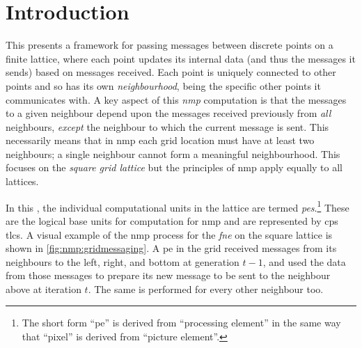 \section{Introduction}
This  presents a framework for passing messages between discrete points on a finite lattice, where each point updates its internal data (and thus the messages it sends) based on messages received.  Each point is uniquely connected to other points and so has its own \emph{neighbourhood}, being the specific other points it communicates with.  A key aspect of this \emph{\gls{nmp}} computation is that the messages to a given neighbour depend upon the messages received previously from \emph{all} neighbours, \emph{except} the neighbour to which the current message is sent.    This necessarily means that in \gls{nmp} each grid location must have at least two neighbours; a single neighbour cannot form a meaningful neighbourhood.  This  focuses on the \emph{square grid lattice}
but the principles of \gls{nmp} apply equally to all lattices.%

In this , the individual computational units in the lattice are termed \emph{\glspl{pe}}.\footnote{The short form ``\gls{pe}'' is derived from “processing element'' in the same way that “pixel'' is derived from “picture element''.}  These are the logical base units for computation for \gls{nmp} and are represented by \gls{cps} \glspl{tlc}.  A visual example of the \gls{nmp} process for the \emph{\gls{fne}} on the square lattice is shown in \cref{fig:nmp:gridmessaging}.  A \gls{pe} in the grid received messages from its neighbours to the left, right, and bottom at generation \(t - 1\), and used the data from those messages to prepare its new message to be sent to the neighbour above at iteration \(t\).  The same is performed for every other neighbour too.

